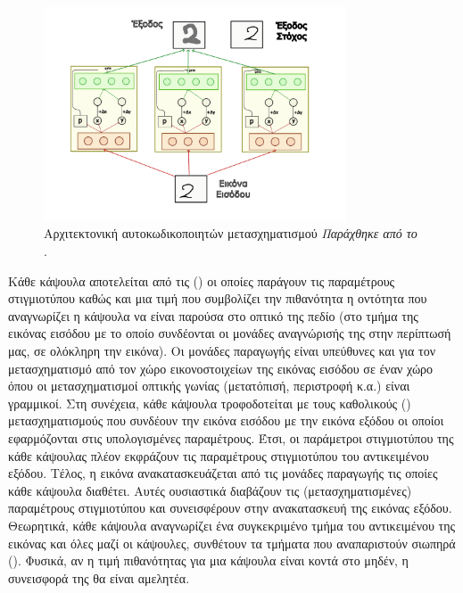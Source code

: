 \begin{figure}[h]
    \centering
    \includegraphics[width=0.8\textwidth]{images/chapter realted work/transforming_auto_gr.pdf}
    \caption{Αρχιτεκτονική αυτο\textendash κωδικοποιητών μετασχηματισμού \textit{Παράχθηκε από το \href{https://inkscape.org/}{}}.}
    \label{fig:trans_autoencoder}
\end{figure}

Κάθε κάψουλα αποτελείται από τις  () οι οποίες παράγουν τις παραμέτρους στιγμιοτύπου καθώς και μια τιμή που συμβολίζει την πιθανότητα η οντότητα που αναγνωρίζει η κάψουλα να είναι παρούσα στο οπτικό της πεδίο (στο τμήμα της εικόνας εισόδου με το οποίο συνδέονται οι μονάδες αναγνώρισής της \textemdash στην περίπτωσή μας, σε ολόκληρη την εικόνα). Οι μονάδες παραγωγής είναι υπεύθυνες και για τον μετασχηματισμό από τον χώρο εικονοστοιχείων της εικόνας εισόδου σε έναν χώρο όπου οι μετασχηματισμοί οπτικής γωνίας (μετατόπισή, περιστροφή κ.α.) είναι γραμμικοί. Στη συνέχεια, κάθε κάψουλα τροφοδοτείται με τους καθολικούς () μετασχηματισμούς που συνδέουν την εικόνα εισόδου με την εικόνα εξόδου οι οποίοι εφαρμόζονται στις υπολογισμένες παραμέτρους. Έτσι, οι παράμετροι στιγμιοτύπου της κάθε κάψουλας πλέον εκφράζουν τις παραμέτρους στιγμιοτύπου του αντικειμένου εξόδου. Τέλος, η εικόνα ανακατασκευάζεται από τις μονάδες παραγωγής  τις οποίες κάθε κάψουλα διαθέτει. Αυτές ουσιαστικά διαβάζουν τις (μετασχηματισμένες) παραμέτρους στιγμιοτύπου και συνεισφέρουν στην ανακατασκευή της εικόνας εξόδου. Θεωρητικά, κάθε κάψουλα αναγνωρίζει ένα συγκεκριμένο τμήμα του αντικειμένου της εικόνας και όλες μαζί οι κάψουλες, συνθέτουν τα τμήματα που αναπαριστούν σιωπηρά (). Φυσικά, αν η τιμή πιθανότητας για μια κάψουλα είναι κοντά στο μηδέν, η συνεισφορά της θα είναι αμελητέα.\par

